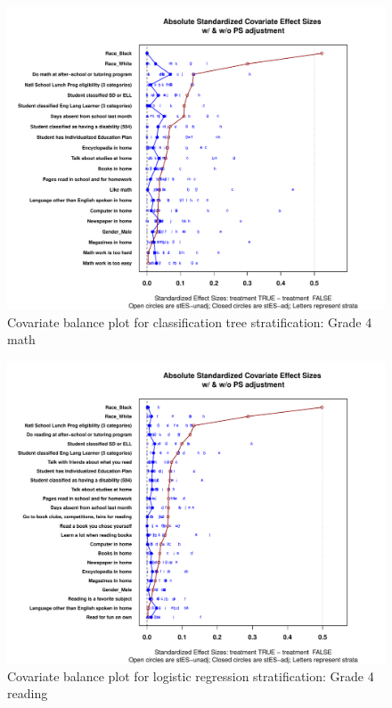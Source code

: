 \begin{figure}
\begin{center}
\includegraphics[width=\textwidth]{../Figures2009/g4math-tree-balance.pdf}
\caption{Covariate balance plot for classification tree stratification: Grade 4 math}
\end{center}
\end{figure}

\begin{figure}
\begin{center}
\includegraphics[width=\textwidth]{../Figures2009/g4read-lr-balance.pdf}
\caption{Covariate balance plot for logistic regression stratification: Grade 4 reading}
\end{center}
\end{figure}

